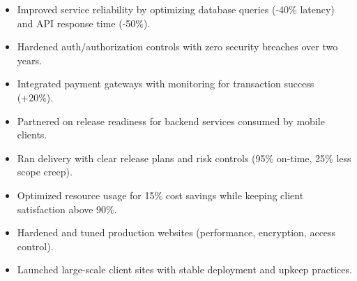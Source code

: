 \begin{itemize}
\item Improved service reliability by optimizing database queries (-40\% latency) and API response time (-50\%).
\item Hardened auth/authorization controls with zero security breaches over two years.
\item Integrated payment gateways with monitoring for transaction success (+20\%).
\item Partnered on release readiness for backend services consumed by mobile clients.
\end{itemize}
\divider

\begin{itemize}
\item Ran delivery with clear release plans and risk controls (95\% on-time, 25\% less scope creep).
\item Optimized resource usage for 15\% cost savings while keeping client satisfaction above 90\%.
\end{itemize}
\divider

\begin{itemize}
\item Hardened and tuned production websites (performance, encryption, access control).
\item Launched large-scale client sites with stable deployment and upkeep practices.
\end{itemize}

\newpage
\switchcolumn
